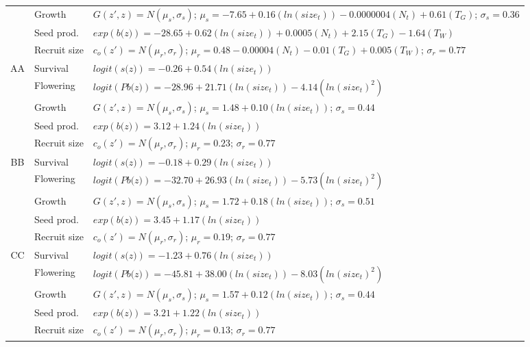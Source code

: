 \documentclass[12pt, letterpaper]{article}
\begin{document}
\begin{spacing}{1.3}
\begin{longtable}[ht!]{c|l|p{}}
         & Growth  &  $G(z',z) = N(\mu_s, \sigma_s)$; $\mu_s = -7.65 + 0.16(ln(size_t)) -0.0000004 (N_t) + 0.61 (T_G)$; $\sigma_s = 0.36$\\
         \rowcolor[gray]{.95}& Seed prod.  & $exp(\textit{b(z)}) = -28.65 + 0.62(ln(size_t)) + 0.0005 (N_t) +2.15(T_G) - 1.64 (T_W)$  \\
         & Recruit size  &  $c_o(z') = N(\mu_r, \sigma_r)$; $\mu_r = 0.48 - 0.00004 (N_t) - 0.01 (T_G) + 0.005 (T_W) $; $\sigma_r = 0.77$ \\
         \hline
         \rowcolor[gray]{.95}AA  &  Survival  &  $logit(\textit{s(z)})= -0.26 + 0.54(ln(size_t))$ \\
         & Flowering  & $logit(\textit{Pb(z)})  = -28.96 + 21.71(ln(size_t)) -4.14(ln(size_t)^2)$ \\
         \rowcolor[gray]{.95}& Growth  &  $G(z',z) = N(\mu_s, \sigma_s)$; $\mu_s = 1.48 + 0.10(ln(size_t))$; $\sigma_s = 0.44$\\
         & Seed prod.  & $exp(\textit{b(z)}) = 3.12 + 1.24(ln(size_t))$  \\
         \rowcolor[gray]{.95}& Recruit size  &  $c_o(z') = N(\mu_r, \sigma_r)$; $\mu_r = 0.23$; $\sigma_r = 0.77$ \\
         \hline
         BB  &  Survival  &  $logit(\textit{s(z)})= -0.18 + 0.29(ln(size_t))$ \\
         \rowcolor[gray]{.95}& Flowering  & $logit(\textit{Pb(z)})  = -32.70 + 26.93(ln(size_t)) -5.73(ln(size_t)^2)$ \\
         & Growth  &  $G(z',z) = N(\mu_s, \sigma_s)$; $\mu_s = 1.72 + 0.18(ln(size_t))$; $\sigma_s = 0.51$\\
         \rowcolor[gray]{.95}& Seed prod.  & $exp(\textit{b(z)}) = 3.45 + 1.17(ln(size_t))$  \\
         & Recruit size  &  $c_o(z') = N(\mu_r, \sigma_r)$; $\mu_r = 0.19$; $\sigma_r = 0.77$ \\
         \hline
         \rowcolor[gray]{.95}CC  &  Survival  &  $logit(\textit{s(z)})= -1.23 + 0.76(ln(size_t))$ \\
         & Flowering  & $logit(\textit{Pb(z)})  = -45.81 + 38.00(ln(size_t)) -8.03(ln(size_t)^2)$ \\
         \rowcolor[gray]{.95}& Growth  &  $G(z',z) = N(\mu_s, \sigma_s)$; $\mu_s = 1.57 + 0.12(ln(size_t))$; $\sigma_s = 0.44$\\
         & Seed prod.  & $exp(\textit{b(z)}) = 3.21 + 1.22(ln(size_t))$  \\
         \rowcolor[gray]{.95}& Recruit size  &  $c_o(z') = N(\mu_r, \sigma_r)$; $\mu_r = 0.13$; $\sigma_r = 0.77$ \\

\end{longtable}
\end{spacing}
\end{document}
